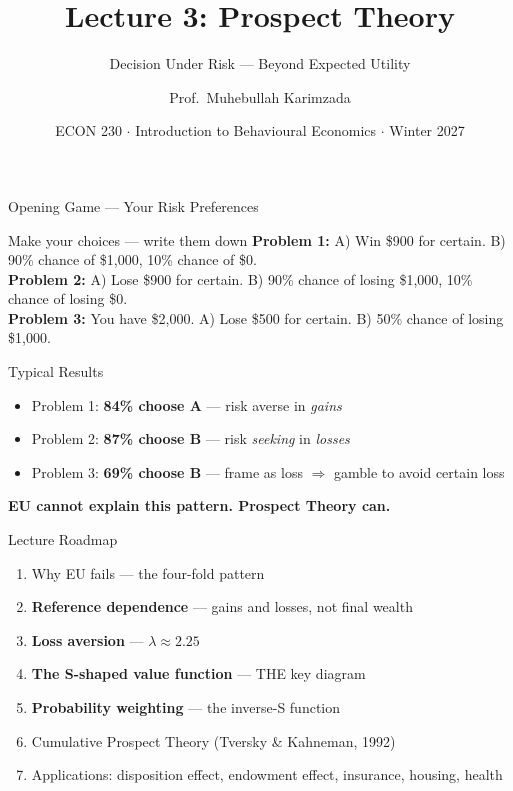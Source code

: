 \documentclass[aspectratio=169]{beamer}
\title{\textbf{Lecture 3: Prospect Theory}}
\subtitle{Decision Under Risk --- Beyond Expected Utility}
\author{Prof.\ Muhebullah Karimzada}
\institute{School of Economics, University of Northern British Columbia}
\date{ECON 230 $\cdot$ Introduction to Behavioural Economics $\cdot$ Winter 2027}
\begin{document}
\begin{frame}[plain]\titlepage\end{frame}

\begin{frame}{Opening Game --- Your Risk Preferences}
\begin{alertblock}{Make your choices --- write them down}
\textbf{Problem 1:} A) Win \$900 for certain. \quad B) 90\% chance of \$1,000, 10\% chance of \$0.\\[0.4em]
\textbf{Problem 2:} A) Lose \$900 for certain. \quad B) 90\% chance of losing \$1,000, 10\% chance of losing \$0.\\[0.4em]
\textbf{Problem 3:} You have \$2,000. \quad A) Lose \$500 for certain. \quad B) 50\% chance of losing \$1,000.
\end{alertblock}
\pause
\begin{block}{Typical Results}
\begin{itemize}
  \item Problem 1: \textbf{84\% choose A} --- risk averse in \textit{gains}
  \item Problem 2: \textbf{87\% choose B} --- risk \textit{seeking} in \textit{losses}
  \item Problem 3: \textbf{69\% choose B} --- frame as loss $\Rightarrow$ gamble to avoid certain loss
\end{itemize}
\textcolor{bepurple}{\textbf{EU cannot explain this pattern. Prospect Theory can.}}
\end{block}
\end{frame}

\begin{frame}{Lecture Roadmap}
\begin{enumerate}[<+->]
  \item Why EU fails --- the four-fold pattern
  \item \textbf{Reference dependence} --- gains and losses, not final wealth
  \item \textbf{Loss aversion} --- $\lambda \approx 2.25$
  \item \textbf{The S-shaped value function} --- THE key diagram
  \item \textbf{Probability weighting} --- the inverse-S function
  \item Cumulative Prospect Theory (Tversky \& Kahneman, 1992)
  \item Applications: disposition effect, endowment effect, insurance, housing, health
\end{enumerate}
\end{frame}
\end{document}
